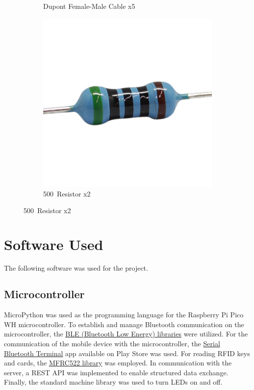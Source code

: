 \documentclass{article}
\begin{document}
\begin{figure}[H]
\begin{subfigure}[b]{0.3\textwidth}
		\caption*{Dupont Female-Male Cable x5}
		\label{fig:cable mh}
	\end{subfigure}
	\hfill
	\begin{subfigure}[b]{0.3\textwidth}
		\includegraphics[width=\textwidth]{../images/resistencia.jpg}
		\caption*{500\textOmega\ Resistor x2}
		\label{fig:resistencia}
	\end{subfigure}
\end{figure}


\section{Software Used}
The following software was used for the project.
\subsection{Microcontroller}
MicroPython was used as the programming language for the Raspberry Pi Pico WH microcontroller.
To establish and manage Bluetooth communication on the microcontroller, the \href{https://github.com/micropython/micropython/tree/master/examples/bluetooth}{BLE (Bluetooth Low Energy) libraries} \cite{micropythonBluetoothExamples} were utilized.
For the communication of the mobile device with the microcontroller, the \href{https://play.google.com/store/apps/details?id=de.kai_morich.serial_usb_terminal&pcampaignid=web_share}{Serial Bluetooth Terminal} app \cite{sam2023ble} available on Play Store was used. For reading RFID keys and cards, the \href{https://github.com/danjperron/micropython-mfrc522/blob/master/mfrc522.py}{MFRC522 library} \cite{danjperron2022mfrc522} was employed.
In communication with the server, a REST API was implemented to enable structured data exchange. Finally, the standard machine library was used to turn LEDs on and off.
\end{document}
